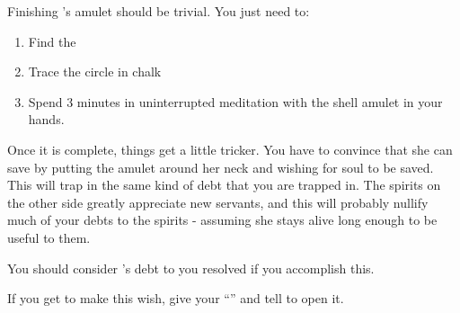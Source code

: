 \documentclass[green]{NeptuneBall}
\begin{document}
\name{\gAmulet{}}

Finishing \cAriel{}'s amulet should be trivial. You just need to:
\begin{enumerate}
\item Find the \sRunicCircle{}
\item Trace the circle in chalk
\item Spend 3 minutes in uninterrupted meditation with the shell amulet in your hands. 
\end{enumerate}

Once it is complete, things get a little tricker. You have to convince \cAriel{} that she can save \cAriel{\their} \cArielsSon{\offspring} by putting the amulet around her neck and wishing for \cArielsSon{\their} soul to be saved. This will trap \cAriel{} in the same kind of debt that you are trapped in. The spirits on the other side greatly appreciate new servants, and this will probably nullify much of your debts to the spirits - assuming she stays alive long enough to be useful to them. 

You should consider \cAriel{}'s debt to you resolved if you accomplish this.

If you get \cAriel{} to make this wish, give \cAriel{\them} your ``\mMEnvelope{\MYname}'' and tell \cAriel{\them} to open it.
\end{document}
